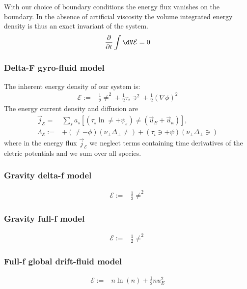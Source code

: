 With our choice of boundary conditions the energy flux
vanishes on the boundary.
In the absence of artificial viscosity the volume integrated
 energy density is thus an exact invariant of the system.
\begin{align}
    \frac{\partial}{\partial t} \int \dV \mathcal E = 0
\end{align}
\subsubsection{ Delta-F gyro-fluid model}
The inherent energy density of our system is:
\begin{align}
 \mathcal{E} := &
 \frac{1}{2}\ne^2  + \frac{1}{2}\tau_i \ni^2 + \frac{1}{2} (\nabla\phi)^2
\end{align}
The energy current density and diffusion are
\begin{align}
  \vec j_{\mathcal E} =& \sum_s a_s\left[
  \left(\tau_s \ln \ne + \psi_s \right)\ne\left(
  \vec u_E + \vec u_\kappa \right) \right]
  , \\
    \Lambda_\mathcal{E} :=  &+ \left( \ne - \phi\right)(\nu_\perp \Delta_\perp \ne)
    + \left( \tau_i \ni + \psi\right)(\nu_\perp \Delta_\perp \ni)
    \label{eq:energy_diffusion_delta}
\end{align}
where in the energy flux $\vec j_{\mathcal E}$
we neglect terms  containing time derivatives
of the eletric potentials and we sum over all species.

\subsubsection{Gravity delta-f model}
\begin{align}
 \mathcal{E} := &
 \frac{1}{2} \ne^2
\end{align}

\subsubsection{Gravity full-f model}
\begin{align}
 \mathcal{E} := &
 \frac{1}{2} \ne^2
\end{align}

\subsubsection{Full-f global drift-fluid model}
\begin{align}
 \mathcal{E} := & n \ln ( n) + \frac{1}{2} n u_E^2
\end{align}






